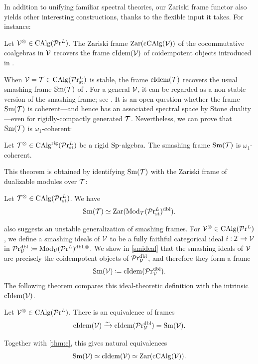 \documentclass[10pt,a4paper,oneside]{article}
\begin{document}
In addition to unifying familiar spectral theories, our Zariski frame functor also yields other interesting constructions, thanks to the flexible input it takes. For instance:
\begin{thm}\label{thm:c}
Let $\mathcal{V}^\otimes \in \operatorname{CAlg}(\mathcal{P}\mathrm{r}^L)$.	The Zariski frame $\operatorname{Zar}(\operatorname{cCAlg}(\mathcal{V}))$ of the cocommutative coalgebras in $\mathcal{V}$ recovers the frame $\operatorname{cIdem}(\mathcal{V})$ of coidempotent objects introduced in \cite{aoki2023sheaves}.
\end{thm}
When $\mathcal{V}=\mathcal{T}\in\operatorname{CAlg}(\mathcal{P}\mathrm{r}_{\operatorname{st}}^L)$ is stable, the frame $\operatorname{cIdem}(\mathcal{T})$ recovers the usual smashing frame $\operatorname{Sm}(\mathcal{T})$ of \cite{BalmerKrauseStevenson20}. For a general $\mathcal{V}$, it can be regarded as a non-stable version of the smashing frame; see \cite{aoki2023sheaves}. It is an open question whether the frame $\operatorname{Sm}(\mathcal{T})$ is coherent---and hence has an associated spectral space by Stone duality---even for rigidly-compactly generated $\mathcal{T}$. Nevertheless, we can prove that $\operatorname{Sm}(\mathcal{T})$ is $\omega_1$-coherent:
\begin{thm}\label{thm:d}
Let $\mathcal{T}^\otimes\in\operatorname{CAlg}^{\operatorname{rig}}(\mathcal{P}\mathrm{r}_{\operatorname{st}}^L)$ be a rigid $\operatorname{Sp}$-algebra. The smashing frame $\operatorname{Sm}(\mathcal{T})$ is $\omega_1$-coherent.
\end{thm}
This theorem is obtained by identifying $\operatorname{Sm}(\mathcal{T})$ with the Zariski frame of dualizable modules over $\mathcal{T}$:
\begin{thm}\label{thm:intro-sm-zar}
Let $\mathcal{T}^\otimes\in\operatorname{CAlg}(\mathcal{P}\mathrm{r}_{\operatorname{st}}^L)$. We have
\[
\operatorname{Sm}(\mathcal{T}) \simeq \operatorname{Zar}(\operatorname{Mod}_\mathcal{T}(\mathcal{P}\mathrm{r}_{\operatorname{st}}^L)^{\operatorname{dbl}}).
\]
\end{thm}
 also suggests an unstable generalization of smashing frames. For $\mathcal{V}^\otimes \in \operatorname{CAlg}(\mathcal{P}\mathrm{r}^L)$, we define a smashing ideals of $\mathcal{V}$ to be a fully faithful categorical ideal $i:\mathcal{I}\to \mathcal{V}$ in $\mathcal{P}\mathrm{r}_{\mathcal{V}}^{\operatorname{dbl}}\coloneqq\operatorname{Mod}_\mathcal{V}(\mathcal{P}\mathrm{r}^L)^{\operatorname{dbl},\otimes}$. We show in \cref{smideal} that the smashing ideals of $\mathcal{V}$ are precisely the coidempotent objects of $\mathcal{P}\mathrm{r}_{\mathcal{V}}^{\operatorname{dbl}}$, and therefore they form a frame
\[
\operatorname{Sm}(\mathcal{V}) \coloneqq \operatorname{cIdem}(\mathcal{P}\mathrm{r}_{\mathcal{V}}^{\operatorname{dbl}}).
\]
The following theorem compares this ideal-theoretic definition with the intrinsic $\operatorname{cIdem}(\mathcal{V})$.
\begin{thm}
Let $\mathcal{V}^\otimes\in \operatorname{CAlg}(\mathcal{P}\mathrm{r}^L)$. There is an equivalence of frames
$$\operatorname{cIdem}(\mathcal{V})\xrightarrow{\sim}\operatorname{cIdem}(\mathcal{P}\mathrm{r}_{\mathcal{V}}^{\operatorname{dbl}})=\operatorname{Sm}(\mathcal{V}).$$
\end{thm}
Together with \cref{thm:c}, this gives natural equivalences
\[
\operatorname{Sm}(\mathcal{V}) \simeq \operatorname{cIdem}(\mathcal{V}) \simeq \operatorname{Zar}(\operatorname{cCAlg}(\mathcal{V})).
\]
\end{document}
